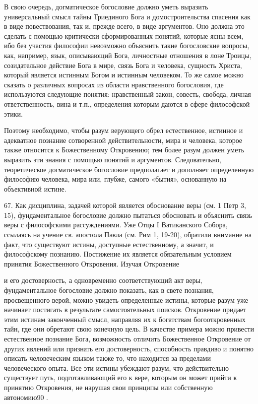 \documentclass[a5paper,10pt]{article}
\begin{document}
В свою очередь, догматическое богословие должно уметь выразить универсальный
смысл тайны Триединого Бога и домостроительства спасения как в виде
повествования, так и, прежде всего, в виде аргументов. Оно должна это сделать с
помощью критически сформированных понятий, которые ясны всем, ибо без участия
философии невозможно объяснить такие богословские вопросы, как, например, язык,
описывающий Бога, личностные отношения в лоне Троицы, созидательное действие
Бога в мире, связь Бога и человека, сущность Христа, который является истинным
Богом и истинным человеком. То же самое можно сказать о различных вопросах из
области нравственного богословия, где используются следующие понятия:
нравственный закон, совесть, свобода, личная ответственность, вина и т.п.,
определения которым даются в сфере философской этики.

Поэтому необходимо, чтобы разум верующего обрел естественное, истинное и
адекватное познание сотворенной действительности, мира и человека, которое
также относится к Божественному Откровению; тем более разум должен уметь
выразить эти знания с помощью понятий и аргументов. Следовательно,
теоретическое догматическое богословие предполагает и дополняет определенную
философию человека, мира или, глубже, самого «бытия», основанную на объективной
истине.

67. Как дисциплина, задачей которой является обоснование веры (см. 1 Петр 3,
15), фундаментальное богословие должно пытаться обосновать и объяснить связь
веры с философскими рассуждениями. Уже Отцы I Ватиканского Собора, ссылаясь на
учение св. апостола Павла (см. Рим 1, 19-20), обратили внимание на факт, что
существуют истины, доступные естественному, а значит, и философскому познанию.
Постижение их является обязательным условием принятия Божественного Откровения.
Изучая Откровение

и его достоверность, а одновременно соответствующий акт веры, фундаментальное
богословие должно показать, как в свете познания, просвещенного верой, можно
увидеть определенные истины, которые разум уже начинает постигать в результате
самостоятельных поисков. Откровение придает этим истинам законченный смысл,
направляя их к богатствам богооткровенных тайн, где они обретают свою конечную
цель. В качестве примера можно привести естественное познание Бога, возможность
отличить Божественное Откровение от других явлений или признать его
достоверность, способность правдиво и понятно описать человеческим языком также
то, что находится за пределами человеческого опыта. Все эти истины убеждают
разум, что действительно существует путь, подготавливающий его к вере, которым
он может прийти к принятию Откровения, не нарушая свои принципы или собственную
автономию90 .
\end{document}
